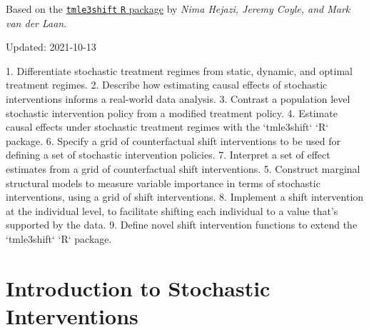 \documentclass[
  12pt, krantz2,
]{krantz}
\newcommand{\passthrough}[1]{#1}
\theoremstyle{definition}
\theoremstyle{definition}
\theoremstyle{definition}
\newcommand{\1}{\mathbbm{1}}
\begin{document}
Based on the \href{https://github.com/tlverse/tmle3shift}{\passthrough{\lstinline!tmle3shift!} \passthrough{\lstinline!R!} package}
by \emph{Nima Hejazi, Jeremy Coyle, and Mark van der Laan}.

Updated: 2021-10-13

\begin{VT1}



1. Differentiate stochastic treatment regimes from static, dynamic, and optimal
   treatment regimes.
2. Describe how estimating causal effects of stochastic interventions informs a
   real-world data analysis.
3. Contrast a population level stochastic intervention policy from a modified
   treatment policy.
4. Estimate causal effects under stochastic treatment regimes with the
   `tmle3shift` `R` package.
6. Specify a grid of counterfactual shift interventions to be used for defining
   a set of stochastic intervention policies.
7. Interpret a set of effect estimates from a grid of counterfactual shift
   interventions.
5. Construct marginal structural models to measure variable importance in terms
   of stochastic interventions, using a grid of shift interventions.
8. Implement a shift intervention at the individual level, to facilitate
   shifting each individual to a value that's supported by the data.
9. Define novel shift intervention functions to extend the `tmle3shift` `R`
   package.

\end{VT1}

\hypertarget{introduction-to-stochastic-interventions}{%
\section{Introduction to Stochastic Interventions}\label{introduction-to-stochastic-interventions}}
\end{document}
